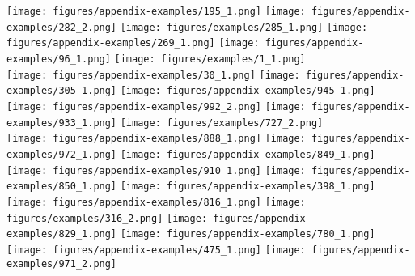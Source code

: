 \begin{figure*}[t]
\centering
    \texttt{[image: figures/appendix-examples/195\_1.png]}\hhs
    \texttt{[image: figures/appendix-examples/282\_2.png]}\hhs
    \texttt{[image: figures/examples/285\_1.png]}\hhs
    \texttt{[image: figures/appendix-examples/269\_1.png]}\hhs
    \texttt{[image: figures/appendix-examples/96\_1.png]}\hhs
    \texttt{[image: figures/examples/1\_1.png]}\vvs
    \\
    \texttt{[image: figures/appendix-examples/30\_1.png]}\hhs
    \texttt{[image: figures/appendix-examples/305\_1.png]}\hhs
    \texttt{[image: figures/appendix-examples/945\_1.png]}\hhs
    \texttt{[image: figures/appendix-examples/992\_2.png]}\hhs
    \texttt{[image: figures/appendix-examples/933\_1.png]}\hhs
    \texttt{[image: figures/examples/727\_2.png]}\vvs
    \\
    \texttt{[image: figures/appendix-examples/888\_1.png]}\hhs
    \texttt{[image: figures/appendix-examples/972\_1.png]}\hhs
    \texttt{[image: figures/appendix-examples/849\_1.png]}\hhs
    \texttt{[image: figures/appendix-examples/910\_1.png]}\hhs
    \texttt{[image: figures/appendix-examples/850\_1.png]}\hhs
    \texttt{[image: figures/appendix-examples/398\_1.png]}\vvs
    \\
    \texttt{[image: figures/appendix-examples/816\_1.png]}\hhs
    \texttt{[image: figures/examples/316\_2.png]}\hhs
    \texttt{[image: figures/appendix-examples/829\_1.png]}\hhs
    \texttt{[image: figures/appendix-examples/780\_1.png]}\hhs
    \texttt{[image: figures/appendix-examples/475\_1.png]}\hhs
    \texttt{[image: figures/appendix-examples/971\_2.png]}\vvs
    \label{fig:more-qualitative}
\end{figure*}

